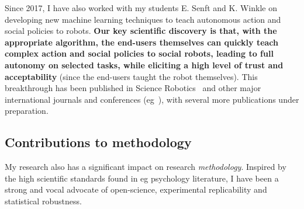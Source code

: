 Since 2017, I have also worked with my students E. Senft and K. Winkle on
developing new machine learning techniques to teach autonomous action and social
policies to robots. \textbf{Our key scientific discovery is that, with
the appropriate algorithm, the end-users
themselves can quickly teach complex action and social policies to social
robots, leading to full autonomy on selected tasks, while eliciting a high level
of trust and acceptability} (since the end-users taught the robot
themselves). This breakthrough has been published in Science
Robotics~\autocite[presented below]{senft2019teaching} and other major
international journals and conferences (eg~\autocite{senft2017supervised,
winkle2020insitu}), with several more publications under preparation.





\subsection{Contributions to methodology}

My research also has a significant impact on research \emph{methodology}.
Inspired by the high scientific standards found in eg psychology literature, I
have been a strong and vocal advocate of open-science, experimental
replicability and statistical robustness.

